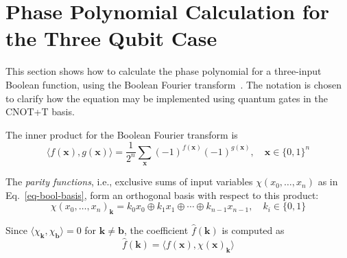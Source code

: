 \documentclass[a4paper]{article}
\begin{document}
\section{Phase Polynomial Calculation for the Three Qubit Case}
\label{Chap:Bool-pbool3q}

\vspace{0.3cm}

This section shows how to calculate the phase polynomial for a three-input Boolean function, using the Boolean Fourier transform~\cite{bib-odonnell}. The notation is chosen to clarify how the equation may be implemented using quantum gates in the CNOT+T basis. 

\vspace{0.3cm}

The inner product for the Boolean Fourier transform is
\begin{equation}
  \label{eq-inner-prod}
  \langle f(\mathbf{x}) , g(\mathbf{x}) \rangle = \frac{1}{2^n} \sum_{\mathbf{x}} (-1)^{f(\mathbf{x})} (-1)^{g(\mathbf{x})}, \quad \mathbf{x} \in \{0,1\}^n
\end{equation}

The {\it parity functions}, i.e., exclusive sums of input variables $\chi(x_0,\ldots,x_n)$ as in Eq.~\ref{eq-bool-basis}, form an orthogonal basis with respect to this product:
\begin{equation}
  \label{eq-bool-basis}
  \chi(x_0,\ldots,x_n)_{\mathbf{k}} = k_0 x_0 \oplus k_1 x_1 \oplus \cdots \oplus k_{n-1} x_{n-1},\quad k_i \in \{0,1\}
\end{equation}

\vspace{0.2cm}

Since $\langle \chi_{\mathbf{k}}, \chi_{\mathbf{b}} \rangle = 0$ for $\mathbf{k} \neq \mathbf{b}$, the coefficient $\hat{f}(\mathbf{k})$ is computed as
\begin{equation}
  \label{eq-fhat-prod}
  \hat{f}(\mathbf{k}) = \langle f(\mathbf{x}), \chi(\mathbf{x})_{\mathbf{k}} \rangle
\end{equation}

\vspace{0.2cm}
\end{document}
